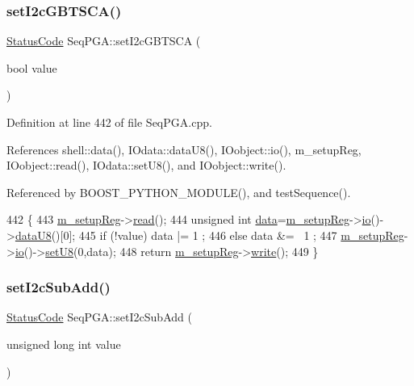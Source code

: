 \subsubsection{\texorpdfstring{set\+I2c\+G\+B\+T\+S\+C\+A()}{setI2cGBTSCA()}}
{\footnotesize\ttfamily \hyperlink{classStatusCode}{Status\+Code} Seq\+P\+G\+A\+::set\+I2c\+G\+B\+T\+S\+CA (\begin{DoxyParamCaption}\item[{bool}]{value }\end{DoxyParamCaption})}



Definition at line 442 of file Seq\+P\+G\+A.\+cpp.



References shell\+::data(), I\+Odata\+::data\+U8(), I\+Oobject\+::io(), m\+\_\+setup\+Reg, I\+Oobject\+::read(), I\+Odata\+::set\+U8(), and I\+Oobject\+::write().



Referenced by B\+O\+O\+S\+T\+\_\+\+P\+Y\+T\+H\+O\+N\+\_\+\+M\+O\+D\+U\+L\+E(), and test\+Sequence().


\begin{DoxyCode}
442                                            \{
443   \hyperlink{classSeqPGA_a03269241e7fc26493cd0595beda334c2}{m\_setupReg}->\hyperlink{classIOobject_aa07610c11963b1db6710e3c76ceea456}{read}();
444   \textcolor{keywordtype}{unsigned} \textcolor{keywordtype}{int} \hyperlink{namespaceshell_a5ea2525995cedc3efd69ea8a7f034d1e}{data}=\hyperlink{classSeqPGA_a03269241e7fc26493cd0595beda334c2}{m\_setupReg}->\hyperlink{classIOobject_af04fb94137c3d86849f478ac5afab5d1}{io}()->\hyperlink{classIOdata_a75e9c318dbac3a39402179070943d4bc}{dataU8}()[0];
445   \textcolor{keywordflow}{if} (!value) data |= 1  ;
446   \textcolor{keywordflow}{else}        data &= ~1 ;
447   \hyperlink{classSeqPGA_a03269241e7fc26493cd0595beda334c2}{m\_setupReg}->\hyperlink{classIOobject_af04fb94137c3d86849f478ac5afab5d1}{io}()->\hyperlink{classIOdata_a6c4fb2f2af01889ada889c2b7aceb24d}{setU8}(0,data);
448   \textcolor{keywordflow}{return} \hyperlink{classSeqPGA_a03269241e7fc26493cd0595beda334c2}{m\_setupReg}->\hyperlink{classIOobject_a9f6984bc9f0fadcf800f1be2523ac744}{write}();
449 \}
\end{DoxyCode}
\mbox{\label{classSeqPGA_a348c5d982223fb5cf2878e5bf3c6429c}} 
\subsubsection{\texorpdfstring{set\+I2c\+Sub\+Add()}{setI2cSubAdd()}}
{\footnotesize\ttfamily \hyperlink{classStatusCode}{Status\+Code} Seq\+P\+G\+A\+::set\+I2c\+Sub\+Add (\begin{DoxyParamCaption}\item[{unsigned long int}]{value }\end{DoxyParamCaption})}



